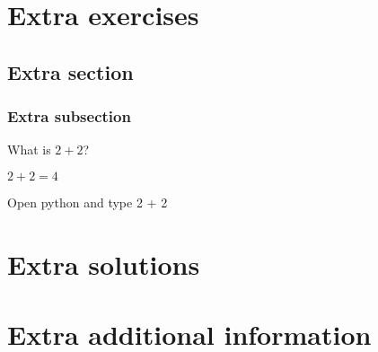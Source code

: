 \documentclass[oneside]{book}
\begin{document}
\chapter{Extra exercises}

\section{Extra section}

\subsection{Extra subsection}

\begin{exercise}[subtitle={Simple Addition}]
  What is \(2 + 2\)?
\end{exercise}

\begin{solution}
  \(2 + 2 = 4\)
\end{solution}

\begin{additionalinformation}
Open python and type 2 + 2
\end{additionalinformation}

\chapter{Extra solutions}

\chapter{Extra additional information}
\end{document}
